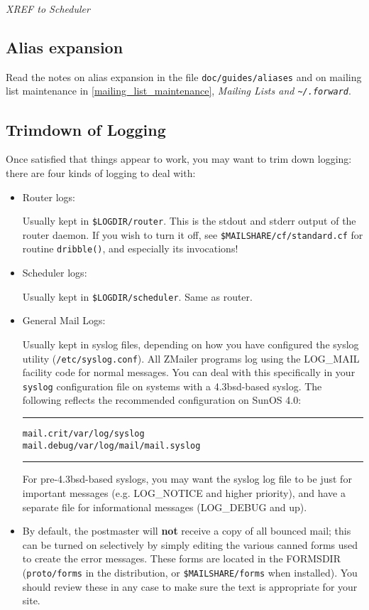 {\large\em XREF to Scheduler}

\subsection{Alias expansion}

Read the notes on alias expansion in the file {\tt doc/guides/aliases} and
on mailing list maintenance in \vref{mailing_list_maintenance}, 
{\em Mailing Lists and \tt\~{}/.forward}.


\subsection{Trimdown of Logging}

Once satisfied that things appear to work, you may want to trim down
logging: there are four kinds of logging to deal with:
\begin{itemize}
\item Router logs:

Usually kept in {\tt \$LOGDIR/router}.  This is the stdout
and stderr output of the router daemon.  If you wish to turn it off,
see {\tt\$MAILSHARE/cf/standard.cf} for routine  {\tt dribble()},
and especially its invocations!

\item Scheduler logs:

Usually kept in {\tt \$LOGDIR/scheduler}.  Same as router.

\vspace{1pt}
\item General Mail Logs:

Usually kept in syslog files, depending on how you have configured
the syslog utility ({\tt /etc/syslog.conf}).
All ZMailer programs log using the LOG\_MAIL facility code for normal
messages.  You can deal with this specifically in your {\tt syslog}
configuration file on systems with a 4.3bsd-based syslog.  The
following reflects the recommended configuration on SunOS 4.0:
\begin{alltt}\medskip\hrule\medskip
mail.crit   /var/log/syslog
mail.debug  /var/log/mail/mail.syslog
\medskip\hrule\end{alltt}\medskip

For pre-4.3bsd-based syslogs, you may want the syslog log file
to be just for important messages (e.g. LOG\_NOTICE and higher
priority), and have a separate file for informational messages
(LOG\_DEBUG and up).

\item By default, the postmaster will {\bf not} receive a copy
of all bounced mail; this can be turned on selectively by simply
editing the various canned forms used to create the error messages.
These forms are located in the FORMSDIR ({\tt proto/forms} in
the distribution, or {\tt \$MAILSHARE/forms} when installed).
You should review these in any case to make sure the text is
appropriate for your site.

\end{itemize}


